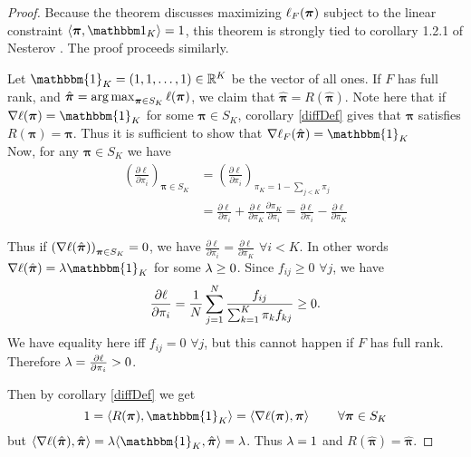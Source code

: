 \begin{proof}
Because the theorem  discusses maximizing \( \ell_{F}({\bm\pi}) \) subject to the linear constraint \( \<\bm\pi,\mathbbm 1_K\> = 1 \), this theorem is strongly tied to corollary 1.2.1 of Nesterov \cite[chapter 1, p. 18]{nesterov2013introductory}.  The proof proceeds similarly.

Let $\mathbbm{1}_K=(1,1,\ldots,1)\in \R^K$ be the vector of all ones.  If $F$ has full rank, and $\hat{\bm\pi}=\operatorname*{arg\,max}_{\bm\pi\in S_K}\ell(\bm\pi)$, we claim that $\hat{\bm\pi}=R(\hat{\bm\pi})$.
 Note here that if $\nabla\ell(\bm\pi)=\mathbbm{1}_K$ for some $\bm\pi \in S_K$, corollary \ref{diffDef} gives that $\bm\pi$ satisfies $R(\bm\pi)=\bm\pi$.  Thus it is sufficient to show that \( \nabla\ell_F(\hat{\bm\pi}) = \mathbbm{1}_K \)\\
Now, for any $\bm\pi\in S_K$ we have
\begin{align}
\left(\frac{\partial\ell}{\partial\pi_i}\right)_{\bm\pi\in S_K}&=\left(\frac{\partial\ell}{\partial\pi_i}\right)_{\pi_K=1-\sum_{j<K}\pi_j} \nonumber\\
&=\frac{\partial\ell}{\partial\pi_i}+\frac{\partial\ell}{\partial\pi_K}\frac{\partial\pi_K}{\partial\pi_i}=\frac{\partial\ell}{\partial\pi_i}-\frac{\partial\ell}{\partial\pi_K} \label{eqn:RestrictPartial}
\end{align}

Thus if $\displaystyle \left(\nabla\ell(\hat{\bm\pi})\right)_{\bm\pi\in S_K}=0$, we have $\frac{\partial\ell}{\partial\pi_i}=\frac{\partial\ell}{\partial\pi_K}$ $\forall i< K$. In other words $\nabla\ell(\hat{\bm\pi})=\gl\mathbbm{1}_K$ for some $\lambda\geq 0$. Since $f_{ij}\geq 0$ $\forall j$, we have
\begin{equation}\label{eqn:PartialEll}
\displaystyle \frac{\partial\ell}{\partial\pi_i}=\frac 1N\sum_{j=1}^{N}\frac{f_{ij}}{\sum_{k=1}^{K}\pi_k f_{kj}}\geq 0. 
\end{equation}
We have equality here iff $f_{ij}=0$ $\forall j$, but this cannot happen if $F$ has full rank. Therefore $\lambda = \pdv{\ell}{\pi_i} > 0$.

Then by corollary \ref{diffDef} we get
\begin{equation}\label{eqn:RpiInnerProd}
1=\langle R(\bm\pi),\mathbbm{1}_K\rangle=\langle \nabla\ell(\bm\pi),\bm\pi\rangle\;\qquad\forall \bm\pi\in S_K
\end{equation}
but $\langle \nabla\ell(\hat{\bm\pi}),\hat{\bm\pi}\rangle=\gl\langle \mathbbm{1}_K,\hat{\bm\pi}\rangle=\gl$. Thus $\lambda=1$ and $R(\hat{\bm\pi})=\hat{\bm\pi}$.


\end{proof}
